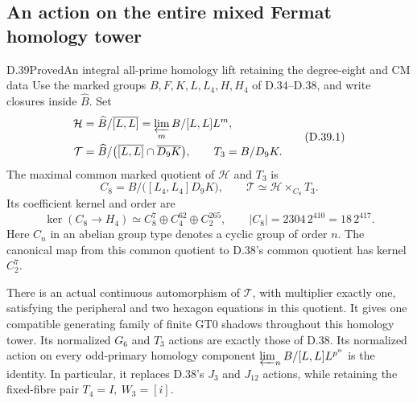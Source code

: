 \subsection{An action on the entire mixed Fermat homology tower}

\begin{statement}{D.39}{Proved}{An integral all-prime homology lift retaining the degree-eight and CM data}
Use the marked groups $B,F,K,L,L_4,H,H_4$ of D.34--D.38,
and write closures inside $\widehat B$. Set
\[
 \begin{split}
 \mathcal H&=\widehat B/\overline{[L,L]}
       =\varprojlim_m B/[L,L]L^m,\\
 \mathcal T&=\widehat B/
       \bigl(\overline{[L,L]}\cap\overline{D_9K}\bigr),
       \qquad T_3=B/D_9K.
 \end{split}                                                   \tag{D.39.1}
\]
The maximal common marked quotient of $\mathcal H$ and $T_3$ is
\[
 C_8=B/\bigl([L_4,L_4]D_9K\bigr),\qquad
 \mathcal T\simeq\mathcal H\mathbin{\times_{C_8}}T_3.
                                                               \tag{D.39.2}
\]
Its coefficient kernel and order are
\[
 \ker(C_8\to H_4)\simeq C_8^7\oplus C_4^{62}\oplus C_2^{265},
 \qquad |C_8|=2304\,2^{410}=18\,2^{417}.                       \tag{D.39.3}
\]
Here $C_n$ in an abelian group type denotes a cyclic group of
order $n$. The canonical map from this common quotient to D.38's
common quotient has kernel $C_2^7$.

There is an actual continuous automorphism of $\mathcal T$,
with multiplier exactly one, satisfying the peripheral and two
hexagon equations in this quotient. It gives one compatible generating family of
finite GT0 shadows throughout this homology tower. Its normalized
$G_6$ and $T_3$ actions are exactly those of D.38. Its normalized
action on every odd-primary homology component
$\varprojlim_n B/[L,L]L^{p^n}$ is the identity.
In particular, it replaces D.38's $J_3$ and $J_{12}$ actions,
while retaining the fixed-fibre pair $T_4=I,\ W_3=[i]$.


\end{statement}
